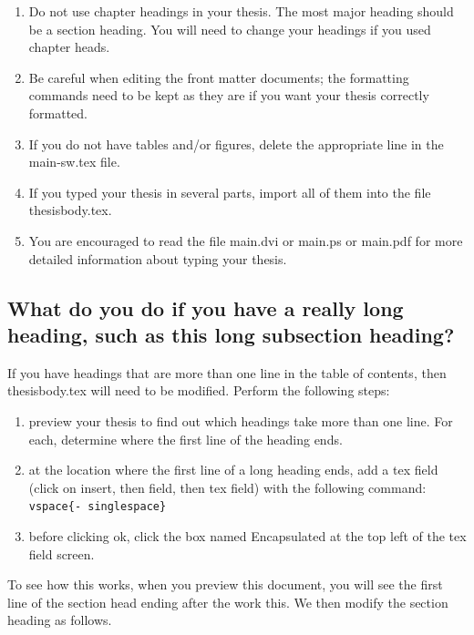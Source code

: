 \begin{enumerate}
\item Do not use chapter headings in your thesis. The most major heading
should be a section heading. You will need to change your headings if you
used chapter heads.

\item Be careful when editing the front matter documents; the formatting
commands need to be kept as they are if you want your thesis correctly
formatted.

\item If you do not have tables and/or figures, delete the appropriate line
in the main-sw.tex file.

\item If you typed your thesis in several parts, import all of them into the
file thesisbody.tex.

\item You are encouraged to read the file main.dvi or main.ps or main.pdf
for more detailed information about typing your thesis.
\end{enumerate}

\subsection{What do you do if you have a really long heading, such as this
long subsection heading?}

If you have headings that are more than one line in the table of contents,
then thesisbody.tex will need to be modified. Perform the following steps:

\begin{enumerate}
\item preview your thesis to find out which headings take more than one
line. For each, determine where the first line of the heading ends.

\item at the location where the first line of a long heading ends, add a tex
field (click on insert, then field, then tex field) with the following
command: \texttt{\TEXTsymbol{\backslash}vspace\{-\TEXTsymbol{\backslash}%
singlespace\} \TEXTsymbol{\backslash}\TEXTsymbol{\backslash}}

\item before clicking ok, click the box named Encapsulated at the top left
of the tex field screen.
\end{enumerate}

To see how this works, when you preview this document, you will see the
first line of the section head ending after the work this. We then modify
the section heading as follows.


